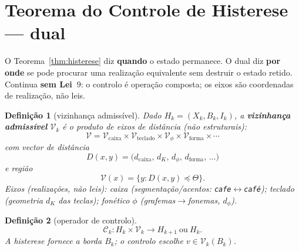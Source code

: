 \documentclass[11pt,a4paper]{article}
\newtheorem{definicao}{Definição}
\begin{document}
\section{Teorema do Controle de Histerese --- dual}\label{sec:controle-histerese}

O Teorema~\ref{thm:histerese} diz \textbf{quando} o estado permanece.
O dual diz \textbf{por onde} se pode procurar uma realização equivalente
sem destruir o estado retido. Continua \textbf{sem Lei~$9$}: o controlo
é operação composta; os eixos são coordenadas de realização, não leis.

\begin{definicao}[vizinhança admissível]\label{def:V-k}
Dado $H_k=(X_k,B_k,I_k)$, a \textbf{vizinhança admissível} $\mathcal{V}_k$
é o produto de eixos de distância (não estruturais):
\[
\boxed{
\mathcal{V}
=
\mathcal{V}_{\mathrm{caixa}}
\times
\mathcal{V}_{\mathrm{teclado}}
\times
\mathcal{V}_{\phi}
\times
\mathcal{V}_{\mathrm{forma}}
\times\cdots
}
\]
com vector de distância
\[
\boxed{
D(x,y)=\bigl(d_{\mathrm{caixa}},\,d_K,\,d_{\phi},\,d_{\mathrm{forma}},\,\ldots\bigr)
}
\]
e região
\[
\boxed{
\mathcal{V}(x)=\{y:D(x,y)\preceq\Theta\}.
}
\]
Eixos (realizações, não leis): \emph{caixa} (segmentação/acentos:
\texttt{cafe}$\leftrightarrow$\texttt{café}); \emph{teclado} (geometria
$d_K$ das teclas); \emph{fonético} $\phi$ (grafemas$\to$fonemas,
$d_{\phi}$).
\end{definicao}

\begin{definicao}[operador de controlo]\label{def:C-k}
\[
\boxed{
\mathcal{C}_k\colon H_k\times\mathcal{V}_k\longrightarrow H_{k+1}\ \text{ou}\ H_k.
}
\]
A histerese fornece a borda $B_k$; o controlo escolhe $v\in\mathcal{V}_k(B_k)$.
\end{definicao}
\end{document}
